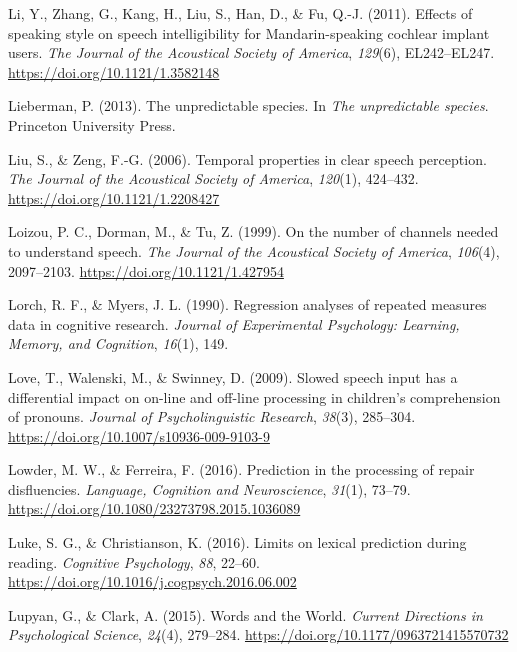 \documentclass[a4paper, nobind]{templates/ociamthesis}
\newlength{\cslhangindent}
\newenvironment{CSLReferences}[2] %
 {%
  \setlength{\parindent}{0pt}
  \ifodd #1
  \let\oldpar\par
  \def\par{\hangindent=\cslhangindent\oldpar}
  \fi
  \setlength{\parskip}{1mm}
  \setlength{\baselineskip}{6mm}
 }%
 {}
\begin{document}
\begin{CSLReferences}{1}{0}
\leavevmode{}%
Li, Y., Zhang, G., Kang, H., Liu, S., Han, D., \& Fu, Q.-J. (2011). {Effects of speaking style on speech intelligibility for Mandarin-speaking cochlear implant users}. \emph{The Journal of the Acoustical Society of America}, \emph{129}(6), EL242--EL247. \url{https://doi.org/10.1121/1.3582148}

\leavevmode{}%
Lieberman, P. (2013). The unpredictable species. In \emph{The unpredictable species}. Princeton University Press.

\leavevmode{}%
Liu, S., \& Zeng, F.-G. (2006). {Temporal properties in clear speech perception}. \emph{The Journal of the Acoustical Society of America}, \emph{120}(1), 424--432. \url{https://doi.org/10.1121/1.2208427}

\leavevmode{}%
Loizou, P. C., Dorman, M., \& Tu, Z. (1999). On the number of channels needed to understand speech. \emph{The Journal of the Acoustical Society of America}, \emph{106}(4), 2097--2103. \url{https://doi.org/10.1121/1.427954}

\leavevmode{}%
Lorch, R. F., \& Myers, J. L. (1990). Regression analyses of repeated measures data in cognitive research. \emph{Journal of Experimental Psychology: Learning, Memory, and Cognition}, \emph{16}(1), 149.

\leavevmode{}%
Love, T., Walenski, M., \& Swinney, D. (2009). {Slowed speech input has a differential impact on on-line and off-line processing in children's comprehension of pronouns}. \emph{Journal of Psycholinguistic Research}, \emph{38}(3), 285--304. \url{https://doi.org/10.1007/s10936-009-9103-9}

\leavevmode{}%
Lowder, M. W., \& Ferreira, F. (2016). {Prediction in the processing of repair disfluencies}. \emph{Language, Cognition and Neuroscience}, \emph{31}(1), 73--79. \url{https://doi.org/10.1080/23273798.2015.1036089}

\leavevmode{}%
Luke, S. G., \& Christianson, K. (2016). Limits on lexical prediction during reading. \emph{Cognitive Psychology}, \emph{88}, 22--60. \url{https://doi.org/10.1016/j.cogpsych.2016.06.002}

\leavevmode{}%
Lupyan, G., \& Clark, A. (2015). Words and the World. \emph{Current Directions in Psychological Science}, \emph{24}(4), 279--284. \url{https://doi.org/10.1177/0963721415570732}


\end{CSLReferences}
\end{document}
